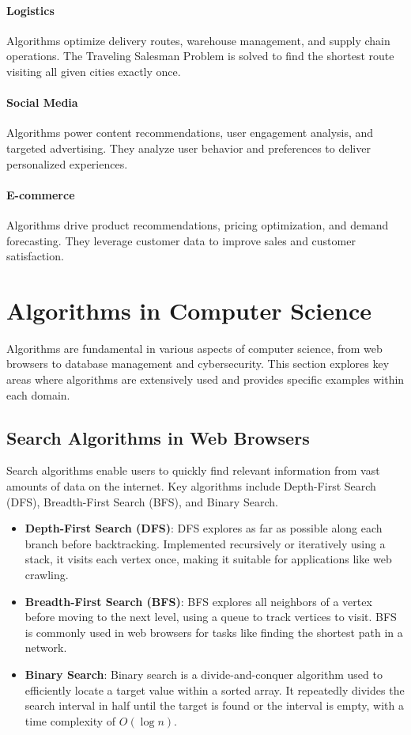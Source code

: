 \documentclass[12pt]{book} %
\begin{document}
\paragraph{Logistics}
Algorithms optimize delivery routes, warehouse management, and supply chain operations. The Traveling Salesman Problem is solved to find the shortest route visiting all given cities exactly once.

\paragraph{Social Media}
Algorithms power content recommendations, user engagement analysis, and targeted advertising. They analyze user behavior and preferences to deliver personalized experiences.

\paragraph{E-commerce}
Algorithms drive product recommendations, pricing optimization, and demand forecasting. They leverage customer data to improve sales and customer satisfaction.


\section{Algorithms in Computer Science}
Algorithms are fundamental in various aspects of computer science, from web browsers to database management and cybersecurity. This section explores key areas where algorithms are extensively used and provides specific examples within each domain.

\subsection{Search Algorithms in Web Browsers}
Search algorithms enable users to quickly find relevant information from vast amounts of data on the internet. Key algorithms include Depth-First Search (DFS), Breadth-First Search (BFS), and Binary Search.

\begin{itemize}
    \item \textbf{Depth-First Search (DFS)}: DFS explores as far as possible along each branch before backtracking. Implemented recursively or iteratively using a stack, it visits each vertex once, making it suitable for applications like web crawling.
    
    \item \textbf{Breadth-First Search (BFS)}: BFS explores all neighbors of a vertex before moving to the next level, using a queue to track vertices to visit. BFS is commonly used in web browsers for tasks like finding the shortest path in a network.
    
    \item \textbf{Binary Search}: Binary search is a divide-and-conquer algorithm used to efficiently locate a target value within a sorted array. It repeatedly divides the search interval in half until the target is found or the interval is empty, with a time complexity of $O(\log n)$.
\end{itemize}
\end{document}
